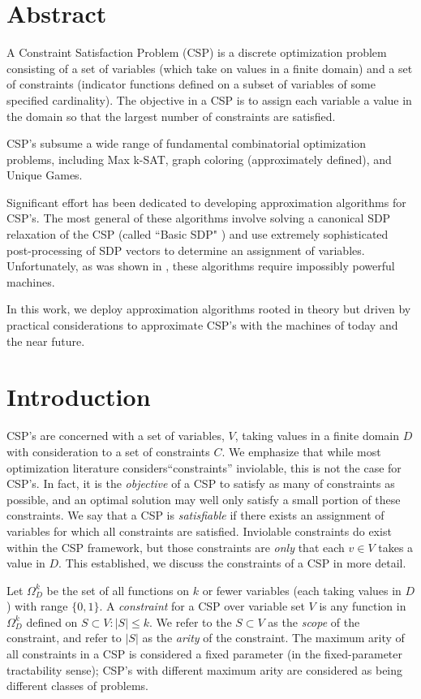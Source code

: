 \documentclass[12pt]{article} %
\begin{document}
\section*{Abstract}

A Constraint Satisfaction Problem (CSP) is a discrete optimization problem consisting of a set of variables (which take on values in a finite domain) and a set of constraints (indicator functions defined on a subset of variables of some specified cardinality). The objective in a CSP is to assign each variable a value in the domain so that the largest number of constraints are satisfied.

CSP's subsume a wide range of fundamental combinatorial optimization problems, including Max k-SAT, graph coloring (approximately defined), and Unique Games.

Significant effort has been dedicated to developing approximation algorithms for CSP's. The most general of these algorithms involve solving a canonical SDP relaxation of the CSP (called ``Basic SDP" \cite{raghavendra2008optimal}) and use extremely sophisticated post-processing of SDP vectors to determine an assignment of variables. Unfortunately, as was shown in \cite{dwivedi2015introduction}, these algorithms require impossibly powerful machines.

In this work, we deploy approximation algorithms rooted in theory but driven by practical considerations to approximate CSP's with the machines of today and the near future. 

\section{Introduction}

CSP's are concerned with a set of variables, $V$, taking values in a finite domain $D$ with consideration to a set of constraints $C$. We emphasize that while most optimization literature considers``constraints'' inviolable, this is not the case for CSP's. In fact, it is the \textit{objective} of a CSP to satisfy as many of constraints as possible, and an optimal solution may well only satisfy a small portion of these constraints. We say that a CSP is \textit{satisfiable} if there exists an assignment of variables for which all constraints are satisfied. Inviolable constraints do exist within the CSP framework, but those constraints are \textit{only} that each $v \in V$ takes a value in $D$. This established, we discuss the constraints of a CSP in more detail. 

Let $\Omega_D^k$ be the set of all functions on $k$ or fewer variables (each taking values in $D$) with range $\{ 0,1 \}$. A \textit{constraint} for a CSP over variable set $V$ is any function in $\Omega_D^k$ defined on $S \subset V : |S| \leq k$. We refer to the $S \subset V$ as the \textit{scope} of the constraint, and refer to $|S|$ as the \textit{arity} of the constraint. The maximum arity of all constraints in a CSP is considered a fixed parameter (in the fixed-parameter tractability sense); CSP's with different maximum arity are considered as being different classes of problems.
\end{document}
